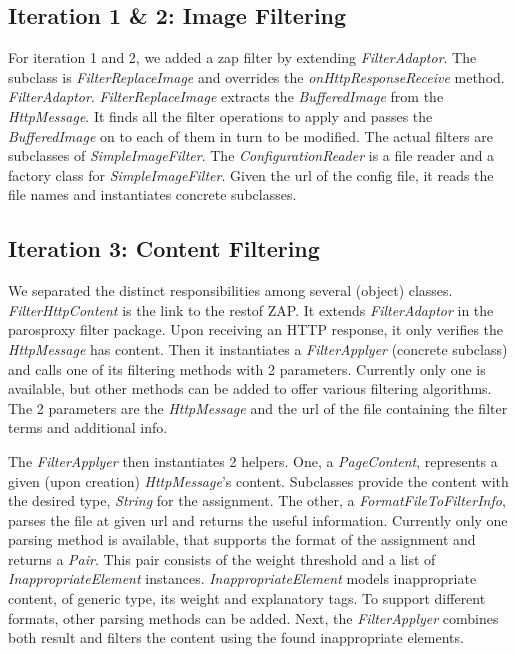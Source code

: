 \subsection{Iteration 1 \& 2: Image Filtering}
For iteration 1 and 2, we added a zap filter by extending \textit{FilterAdaptor}. The subclass is \textit{FilterReplaceImage} and overrides the \textit{onHttpResponseReceive} method. \textit{FilterAdaptor}. \textit{FilterReplaceImage} extracts the \textit{BufferedImage} from the \textit{HttpMessage}. It finds all the filter operations to apply and passes the \textit{BufferedImage} on to each of them in turn to be modified.
The actual filters are subclasses of \textit{SimpleImageFilter}. The \textit{ConfigurationReader} is a file reader and a factory class for \textit{SimpleImageFilter}. Given the url of the config file, it reads the file names and instantiates concrete subclasses.

\subsection{Iteration 3: Content Filtering}
We separated the distinct responsibilities among several (object) classes. \textit{FilterHttpContent} is the link to the restof ZAP. It extends \textit{FilterAdaptor} in the parosproxy filter package. Upon receiving an HTTP response, it only verifies the \textit{HttpMessage} has content. Then it instantiates a \textit{FilterApplyer} (concrete subclass) and calls one of its filtering methods with 2 parameters. Currently only one is available, but other methods can be added to offer various filtering algorithms. The 2 parameters are the \textit{HttpMessage} and the url of the file containing the filter terms and additional info.
\par
The \textit{FilterApplyer} then instantiates 2 helpers. One, a \textit{PageContent}, represents a given (upon creation) \textit{HttpMessage}'s content. Subclasses provide the content with the desired type, \textit{String} for the assignment. The other, a \textit{FormatFileToFilterInfo}, parses the file at given url and returns the useful information. Currently only one parsing method is available, that supports the format of the assignment and returns a \textit{Pair}. This pair consists of the weight threshold and a list of \textit{InappropriateElement} instances. \textit{InappropriateElement} models inappropriate content, of generic type, its weight and explanatory tags. To support different formats, other parsing methods can be added.
Next, the \textit{FilterApplyer} combines both result and filters the content using the found inappropriate elements.
